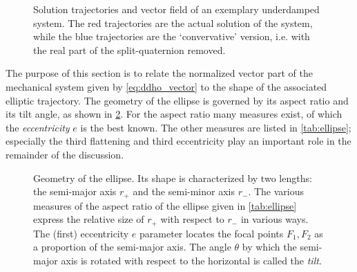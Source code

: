 \begin{figure}[ht!]
    \centering
    
    \caption{Solution trajectories and vector field of an exemplary underdamped system. The red trajectories are the actual solution of the system, while the blue trajectories are the `convervative' version, i.e. with the real part of the split-quaternion removed.}
    \label{fig:underdamped}
\end{figure}

The purpose of this section is to relate the normalized vector part of the mechanical system given by \cref{eq:ddho_vector} to the shape of the associated elliptic trajectory. The geometry of the ellipse is governed by its aspect ratio and its tilt angle, as shown in \cref{fig:ellipse}. For the aspect ratio many measures exist, of which the \emph{eccentricity} \(e\) is the best known. The other measures are listed in \cref{tab:ellipse}; especially the third flattening and third eccentricity play an important role in the remainder of the discussion.

\begin{figure}[ht]
    \centering
    
    \caption{Geometry of the ellipse. Its shape is characterized by two lengths: the semi-major axis \(r_+\) and the semi-minor axis \(r_-\). The various measures of the aspect ratio of the ellipse given in \cref{tab:ellipse} express the relative size of \(r_+\) with respect to \(r_-\) in various ways. The (first) eccentricity \(e\) parameter locates the focal points \(F_1, F_2\) as a proportion of the semi-major axis. The angle \(\theta\) by which the semi-major axis is rotated with respect to the horizontal is called the \emph{tilt}.}
    \label{fig:ellipse}
\end{figure}

